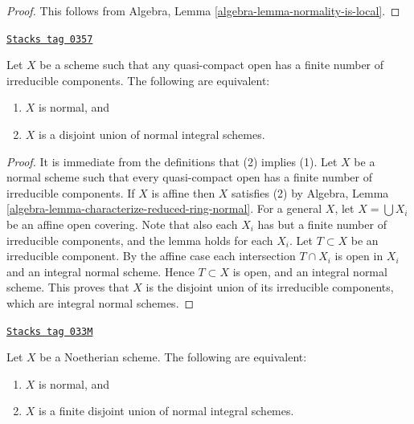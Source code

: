 \begin{proof}
This follows from
Algebra, Lemma \ref{algebra-lemma-normality-is-local}.
\end{proof}

\begin{lemma}
\label{properties-lemma-normal-locally-finite-nr-irreducibles}
\href{https://stacks.math.columbia.edu/tag/0357}{\texttt{Stacks tag 0357}}

Let $X$ be a scheme such that any quasi-compact open has a finite number
of irreducible components. The following are equivalent:
\begin{enumerate}
\item $X$ is normal, and
\item $X$ is a disjoint union of normal integral schemes.
\end{enumerate}
\end{lemma}

\begin{proof}
It is immediate from the definitions that (2) implies (1).
Let $X$ be a normal scheme such that every quasi-compact open
has a finite number of irreducible components.
If $X$ is affine then $X$ satisfies (2) by
Algebra, Lemma \ref{algebra-lemma-characterize-reduced-ring-normal}.
For a general $X$, let $X = \bigcup X_i$ be
an affine open covering. Note that also each $X_i$ has
but a finite number of irreducible components, and the lemma holds
for each $X_i$. Let $T \subset X$ be an irreducible component.
By the affine case each intersection $T \cap X_i$ is open in $X_i$
and an integral normal scheme.
Hence $T \subset X$ is open, and an integral normal scheme.
This proves that $X$ is the disjoint union of its irreducible components,
which are integral normal schemes.
\end{proof}

\begin{lemma}
\label{properties-lemma-normal-Noetherian}
\href{https://stacks.math.columbia.edu/tag/033M}{\texttt{Stacks tag 033M}}

Let $X$ be a Noetherian scheme.
The following are equivalent:
\begin{enumerate}
\item $X$ is normal, and
\item $X$ is a finite disjoint union of normal integral schemes.
\end{enumerate}
\end{lemma}

